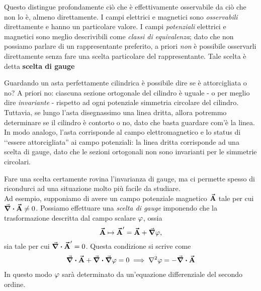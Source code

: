 Questo distingue profondamente ciò che è effettivamente osservabile da ciò che non lo è, almeno direttamente. I campi elettrici e magnetici sono \textit{osservabili} direttamente e hanno un particolare valore. I campi \textit{potenziali} elettrici e magnetici sono meglio descrivibili come \textit{classi di equivalenza}; dato che non possiamo parlare di un rappresentante preferito, a priori \textit{non} è possibile osservarli direttamente senza fare una scelta particolare del rappresentante. Tale scelta è detta \textbf{scelta di gauge}
\begin{intuit}
	Guardando un asta perfettamente cilindrica è possibile dire se è attorcigliata o no? A priori no: ciascuna sezione ortogonale del cilindro è uguale - o per meglio dire \textit{invariante} - rispetto ad ogni potenziale simmetria circolare del cilindro. Tuttavia, se lungo l'asta disegnassimo una linea dritta, allora potremmo determinare se il cilindro è contorto o no, dato che basta guardare com'è la linea.\\
	In modo analogo, l'asta corrisponde al campo elettromagnetico e lo status di ‘‘essere attorcigliata'' ai campo potenziali: la linea dritta corrisponde ad una scelta di gauge, dato che le sezioni ortogonali non sono invarianti per le simmetrie circolari.
\end{intuit}
\noindent Fare una scelta certamente rovina l'invarianza di gauge, ma ci permette spesso di ricondurci ad una situazione molto più facile da studiare.\\
Ad esempio, supponiamo di avere un campo potenziale magnetico $\vb*{\va{A}}$ tale per cui $\div{\vb*{\va{A}}}\neq 0$. Possiamo effettuare una \textit{scelta di gauge} imponendo che la trasformazione descritta dal campo scalare $\oldphi$, ossia
\begin{equation*}
	\vba{A}\mapsto\vba{A}'=\vba{A}+\grad{\oldphi},
\end{equation*}
sia tale per cui $\div{\vb*{\va{A}}'}=0$. Questa condizione si scrive come
\begin{gather*}
	\div\vba{A}+\div\grad\oldphi=0 \implies \laplacian\oldphi= -\div\vba{A}
\end{gather*}
In questo modo $\oldphi$ sarà determinato da un'equazione differenziale del secondo ordine.


